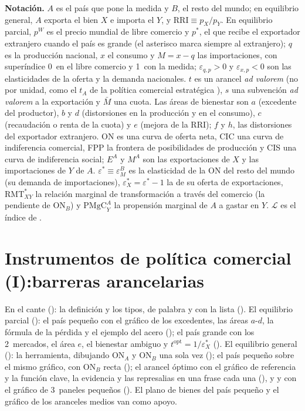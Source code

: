 \documentclass[11pt]{article}
\begin{document}
\begin{anotaciones}
\textbf{Notación.} $A$ es el país que pone la medida y $B$, el resto del mundo; en equilibrio general, $A$ exporta el bien $X$ e importa el $Y$, y $\mathrm{RRI}\equiv p_X/p_Y$. En equilibrio parcial, $p^W$ es el precio mundial de libre comercio y $p^*$, el que recibe el exportador extranjero cuando el país es grande (el asterisco marca siempre al extranjero); $q$ es la producción nacional, $x$ el consumo y $M=x-q$ las importaciones, con superíndice 0~en el libre comercio y 1~con la medida; $\varepsilon_{q,p}>0$ y $\varepsilon_{x,p}<0$ son las elasticidades de la oferta y la demanda nacionales. $t$ es un arancel \emph{ad valorem} (no por unidad, como el $t_A$ de la política comercial estratégica ), $s$ una subvención \emph{ad valorem} a la exportación y $\bar M$ una cuota. Las áreas de bienestar son $a$ (excedente del productor), $b$ y $d$ (distorsiones en la producción y en el consumo), $c$ (recaudación o renta de la cuota) y $e$ (mejora de la RRI); $f$ y $h$, las distorsiones del exportador extranjero. ON es una curva de oferta neta, CIC una curva de indiferencia comercial, FPP la frontera de posibilidades de producción y CIS una curva de indiferencia social; $E^A$ y $M^A$ son las exportaciones de $X$ y las importaciones de $Y$ de $A$. $\varepsilon^*\equiv\varepsilon^B_M$ es la elasticidad de la ON del resto del mundo (su demanda de importaciones), $\varepsilon^*_X=\varepsilon^*-1$ la de su oferta de exportaciones, $\mathrm{RMT}^*_{XY}$ la relación marginal de transformación a través del comercio (la pendiente de ON$_B$) y $\mathrm{PMgC}^A_Y$ la propensión marginal de $A$ a gastar en $Y$. $\mathcal{L}$ es el índice de .
\end{anotaciones}

\section{Instrumentos de política comercial (I):\newline barreras arancelarias}\label{sec:arancelarias}

\begin{notaopositor}
En el cante (): la definición y los tipos, de palabra y con la lista (). El equilibrio parcial (): el país pequeño con el gráfico de los excedentes, las áreas $a$-$d$, la fórmula de la pérdida y el ejemplo del acero (); el país grande con los 2~mercados, el área $e$, el bienestar ambiguo y $t^{\mathrm{opt}}=1/\varepsilon^*_X$ (). El equilibrio general (): la herramienta, dibujando ON$_A$ y ON$_B$ una sola vez (); el país pequeño sobre el mismo gráfico, con ON$_B$ recta (); el arancel óptimo con el gráfico de referencia y la función clave, la evidencia y las represalias en una frase cada una (), y  y  con el gráfico de 3~paneles pequeños (). El plano de bienes del país pequeño y el gráfico de los aranceles medios van como apoyo.
\end{notaopositor}
\end{document}
